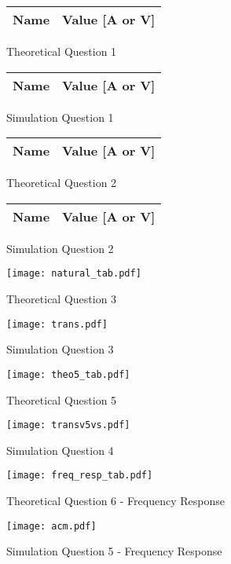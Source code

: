 \vspace{1cm}
\begin{figure}[H]
      \centering
      \begin{tabular}{ | c | c | }
      \hline    
      {\bf Name} & {\bf Value [A or V]} \\ \hline
      
      \hline
      \end{tabular}
      \caption{Theoretical Question 1}
    \endminipage\hfill
      \centering
      \begin{tabular}{ | c | c | }
      \hline    
      {\bf Name} & {\bf Value [A or V]} \\ \hline
      
      \end{tabular}
      \caption{Simulation Question 1}
    \endminipage\hfill
\end{figure}
\newpage
\vspace{0.1cm}
\begin{figure}[H]
      \centering
      \begin{tabular}{ | c | c | }
      \hline    
      {\bf Name} & {\bf Value [A or V]} \\ \hline
      
      \hline
      \end{tabular}
      \caption{Theoretical Question 2}
    \endminipage\hfill
      \centering
      \begin{tabular}{ | c | c | }
      \hline    
      {\bf Name} & {\bf Value [A or V]} \\ \hline
      
      \end{tabular}
      \caption{Simulation Question 2}
    \endminipage\hfill
\end{figure}
\vspace{0.1cm}
\begin{figure}[H]
      \texttt{[image: natural\_tab.pdf]}
      \caption{Theoretical Question 3}
    \endminipage\hfill
      \texttt{[image: trans.pdf]}
      \caption{Simulation Question 3}
    \endminipage\hfill
\end{figure}
\vspace{0.1cm}
\begin{figure}[H]
      \texttt{[image: theo5\_tab.pdf]}
      \caption{Theoretical Question 5}
    \endminipage\hfill
      \texttt{[image: transv5vs.pdf]}
      \caption{Simulation Question 4}
    \endminipage\hfill
\end{figure}
\vspace{0.1cm}
\begin{figure}[H]
      \texttt{[image: freq\_resp\_tab.pdf]}
      \caption{Theoretical Question 6 - Frequency Response}
    \endminipage\hfill
      \texttt{[image: acm.pdf]}
      \caption{Simulation Question 5 - Frequency Response}
    \endminipage\hfill
\end{figure}
\vspace{0.1cm}

